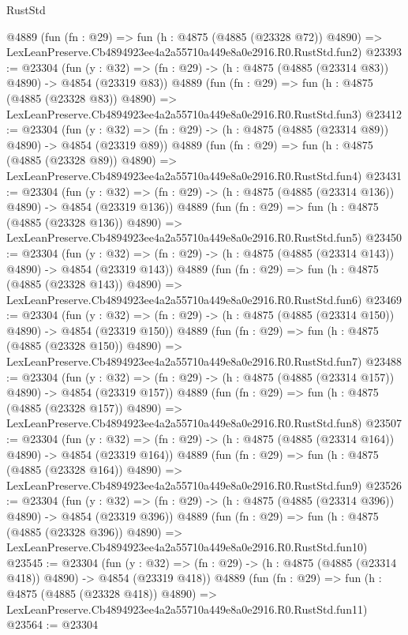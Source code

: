 \begin{lexlean}{RustStd}
\begin{coremodule}
    @4889
    (fun (fn : @29) =>
    fun (h : @4875 (@4885 (@23328 @72)) @4890) =>
    LexLeanPreserve.Cb4894923ee4a2a55710a449e8a0e2916.R0.RustStd.fun2)
@23393 := @23304
    (fun (y : @32) => (fn : @29) -> (h : @4875 (@4885 (@23314 @83)) @4890) -> @4854 (@23319 @83))
    @4889
    (fun (fn : @29) =>
    fun (h : @4875 (@4885 (@23328 @83)) @4890) =>
    LexLeanPreserve.Cb4894923ee4a2a55710a449e8a0e2916.R0.RustStd.fun3)
@23412 := @23304
    (fun (y : @32) => (fn : @29) -> (h : @4875 (@4885 (@23314 @89)) @4890) -> @4854 (@23319 @89))
    @4889
    (fun (fn : @29) =>
    fun (h : @4875 (@4885 (@23328 @89)) @4890) =>
    LexLeanPreserve.Cb4894923ee4a2a55710a449e8a0e2916.R0.RustStd.fun4)
@23431 := @23304
    (fun (y : @32) => (fn : @29) -> (h : @4875 (@4885 (@23314 @136)) @4890) -> @4854 (@23319 @136))
    @4889
    (fun (fn : @29) =>
    fun (h : @4875 (@4885 (@23328 @136)) @4890) =>
    LexLeanPreserve.Cb4894923ee4a2a55710a449e8a0e2916.R0.RustStd.fun5)
@23450 := @23304
    (fun (y : @32) => (fn : @29) -> (h : @4875 (@4885 (@23314 @143)) @4890) -> @4854 (@23319 @143))
    @4889
    (fun (fn : @29) =>
    fun (h : @4875 (@4885 (@23328 @143)) @4890) =>
    LexLeanPreserve.Cb4894923ee4a2a55710a449e8a0e2916.R0.RustStd.fun6)
@23469 := @23304
    (fun (y : @32) => (fn : @29) -> (h : @4875 (@4885 (@23314 @150)) @4890) -> @4854 (@23319 @150))
    @4889
    (fun (fn : @29) =>
    fun (h : @4875 (@4885 (@23328 @150)) @4890) =>
    LexLeanPreserve.Cb4894923ee4a2a55710a449e8a0e2916.R0.RustStd.fun7)
@23488 := @23304
    (fun (y : @32) => (fn : @29) -> (h : @4875 (@4885 (@23314 @157)) @4890) -> @4854 (@23319 @157))
    @4889
    (fun (fn : @29) =>
    fun (h : @4875 (@4885 (@23328 @157)) @4890) =>
    LexLeanPreserve.Cb4894923ee4a2a55710a449e8a0e2916.R0.RustStd.fun8)
@23507 := @23304
    (fun (y : @32) => (fn : @29) -> (h : @4875 (@4885 (@23314 @164)) @4890) -> @4854 (@23319 @164))
    @4889
    (fun (fn : @29) =>
    fun (h : @4875 (@4885 (@23328 @164)) @4890) =>
    LexLeanPreserve.Cb4894923ee4a2a55710a449e8a0e2916.R0.RustStd.fun9)
@23526 := @23304
    (fun (y : @32) => (fn : @29) -> (h : @4875 (@4885 (@23314 @396)) @4890) -> @4854 (@23319 @396))
    @4889
    (fun (fn : @29) =>
    fun (h : @4875 (@4885 (@23328 @396)) @4890) =>
    LexLeanPreserve.Cb4894923ee4a2a55710a449e8a0e2916.R0.RustStd.fun10)
@23545 := @23304
    (fun (y : @32) => (fn : @29) -> (h : @4875 (@4885 (@23314 @418)) @4890) -> @4854 (@23319 @418))
    @4889
    (fun (fn : @29) =>
    fun (h : @4875 (@4885 (@23328 @418)) @4890) =>
    LexLeanPreserve.Cb4894923ee4a2a55710a449e8a0e2916.R0.RustStd.fun11)
@23564 := @23304

\end{coremodule}
\end{lexlean}
